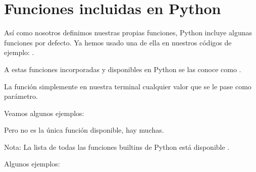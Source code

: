 \documentclass[a4paper,12pt,spanish]{sphinxmanual}
\begin{document}
\sphinxstepscope


\chapter{Funciones incluidas en Python}
\label{\detokenize{builtins:funciones-incluidas-en-python}}\label{\detokenize{builtins::doc}}
\sphinxAtStartPar
Así como nosotros definimos nuestras propias funciones, Python incluye
algunas funciones por defecto. Ya hemos usado una de ella en nuestros códigos de
ejemplo: .

\sphinxAtStartPar
A estas funciones incorporadas y disponibles en Python se las conoce como .

\sphinxAtStartPar
La función  simplemente  en nuestra terminal cualquier
valor que se le pase como parámetro.

\sphinxAtStartPar
Veamos algunos ejemplos:

\begin{sphinxVerbatim}[commandchars=\\\{\}]
  
\end{sphinxVerbatim}

\sphinxAtStartPar
Pero  no es la única función disponible, hay muchas.

\sphinxAtStartPar
Nota: La lista de todas las funciones built\sphinxhyphen{}ins de Python está disponible
.

\sphinxAtStartPar
Algunos ejemplos:
\end{document}
